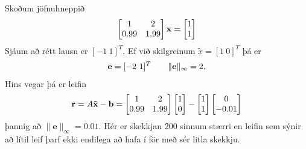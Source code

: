 \documentclass[letterpaper,10pt,icelandic]{sphinxmanual}
\begin{document}
Skoðum jöfnuhneppið
\begin{gather}
\begin{split}\left[\begin{matrix}
     1& 2 \\
     0.99 & 1.99
  \end{matrix}\right]
  \mathbf{x} =
\left[\begin{matrix}
     1 \\
     1
  \end{matrix}\right]\end{split}\notag
\end{gather}
Sjáum að rétt lausn er \([-1 \ 1]^T\). Ef við skilgreinum
\(\tilde x = [1 \ 0]^T\) þá er
\begin{gather}
\begin{split}\mathbf{e} = [-2 \ 1]^T \qquad \|\mathbf{e}\|_\infty = 2.\end{split}\notag
\end{gather}
Hins vegar þá er leifin
\begin{gather}
\begin{split}\mathbf{r} = A\mathbf{\tilde x} -\mathbf{b} = \left[\begin{matrix}
     1& 2 \\
     0.99 & 1.99
  \end{matrix}\right]
\left[\begin{matrix}
     1\\
     0
  \end{matrix}\right] -
\left[\begin{matrix}
     1 \\
     1
  \end{matrix}\right]
\left[\begin{matrix}
     0 \\
     -0.01
  \end{matrix}\right]\end{split}\notag
\end{gather}
þannig að \(\|\mathbf{e}\|_\infty = 0.01\). Hér er skekkjan 200 sinnum
stærri en leifin sem sýnir að lítil leif þarf ekki endilega að hafa í för með sér
litla skekkju.

\end{document}
